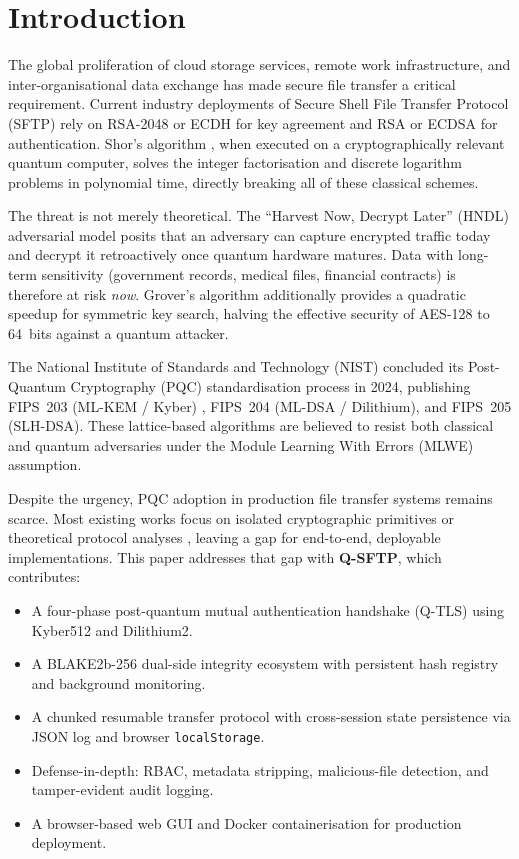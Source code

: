 \section{Introduction}

The global proliferation of cloud storage services, remote work
infrastructure, and inter-organisational data exchange has made
secure file transfer a critical requirement. Current industry
deployments of Secure Shell File Transfer Protocol (SFTP)
\cite{ylonen2006ssh} rely on RSA-2048 or ECDH for key agreement
and RSA or ECDSA for authentication. Shor's algorithm
\cite{shor1994algorithms}, when executed on a cryptographically
relevant quantum computer, solves the integer factorisation and
discrete logarithm problems in polynomial time, directly breaking
all of these classical schemes.

The threat is not merely theoretical. The ``Harvest Now, Decrypt
Later'' (HNDL) adversarial model \cite{mosca2018cybersecurity}
posits that an adversary can capture encrypted traffic today and
decrypt it retroactively once quantum hardware matures. Data with
long-term sensitivity (government records, medical files, financial
contracts) is therefore at risk \emph{now}. Grover's algorithm
\cite{grover1996fast} additionally provides a quadratic speedup for
symmetric key search, halving the effective security of AES-128 to
64~bits against a quantum attacker.

The National Institute of Standards and Technology (NIST) concluded
its Post-Quantum Cryptography (PQC) standardisation process in 2024,
publishing FIPS~203 (ML-KEM / Kyber) \cite{nist2024pqc},
FIPS~204 (ML-DSA / Dilithium), and FIPS~205 (SLH-DSA). These
lattice-based algorithms are believed to resist both classical and
quantum adversaries under the Module Learning With Errors (MLWE)
assumption.

Despite the urgency, PQC adoption in production file transfer systems
remains scarce. Most existing works focus on isolated cryptographic
primitives or theoretical protocol analyses \cite{dam2023survey},
leaving a gap for end-to-end, deployable implementations.
This paper addresses that gap with \textbf{Q-SFTP}, which contributes:

\begin{itemize}
  \item A four-phase post-quantum mutual authentication handshake
        (Q-TLS) using Kyber512 and Dilithium2.
  \item A BLAKE2b-256 \cite{aumasson2013blake2} dual-side integrity
        ecosystem with persistent hash registry and background monitoring.
  \item A chunked resumable transfer protocol with cross-session
        state persistence via JSON log and browser \texttt{localStorage}.
  \item Defense-in-depth: RBAC, metadata stripping, malicious-file
        detection, and tamper-evident audit logging.
  \item A browser-based web GUI and Docker containerisation for
        production deployment.
\end{itemize}

